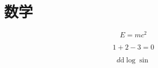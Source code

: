 \chapter{数学}

\begin{equation}
    E=mc^2
\end{equation}

\begin{equation}
1 + 2 - 3 = 0
\end{equation}

\begin{equation}
d\mathrm{d}\log \sin
\end{equation}
